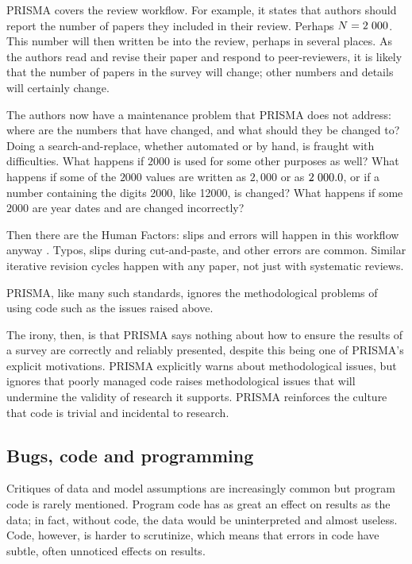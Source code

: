 \documentclass{comjnl}
\begin{document}
PRISMA covers the review workflow. For example, it states that authors should report the number of papers they included in their review. Perhaps $N=2\hskip 0.3em 000$. This number will then written be into the review, perhaps in several places. As the authors read and revise their paper and respond to peer-reviewers, it is likely that the number of papers in the survey will change; other numbers and details will certainly change. 

The authors now have a maintenance problem that PRISMA does not address: where are the numbers that have changed, and what should they be changed to? Doing a search-and-replace, whether automated or by hand, is fraught with difficulties. What happens if $2000$ is used for some other purposes as well? What happens if some of the $2000$ values are written as $2,000$ or as $2\hskip 0.3em 000.0$, or if a number containing the digits 2000, like 12000, is changed? What happens if some $2000$ are year dates and are changed incorrectly? 

Then there are the Human Factors: slips and errors will happen in this workflow anyway \cite{engima}. Typos, slips during cut-and-paste, and other errors are common. Similar iterative revision cycles happen with any paper, not just with systematic reviews. 

PRISMA, like many such standards, ignores the methodological problems of using code such as the issues raised above. 

The irony, then, is that PRISMA says nothing about how to ensure the results of a survey are correctly and reliably presented, despite this being one of PRISMA's explicit motivations. PRISMA explicitly warns about methodological issues, but ignores that poorly managed code raises methodological issues that will undermine the validity of research it supports. PRISMA reinforces the culture that code is trivial and incidental to research.

\subsection{Bugs, code and programming}\label{knowledge}
Critiques of data and model assumptions are increasingly common \cite{critiques,diagnosis-reviews} but program code is rarely mentioned. Program code has as great an effect on results as the data; in fact, without code, the data would be uninterpreted and almost useless. Code, however, is harder to scrutinize, which means that errors in code have subtle, often unnoticed effects on results.
\end{document}
